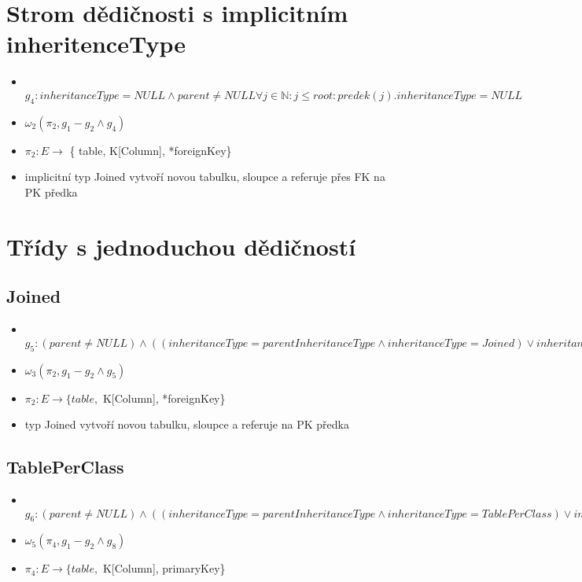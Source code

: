 \documentclass[11pt,a4paper]{article}   	%
\begin{document}
 	\section{Strom dědičnosti s implicitním inheritenceType}
 		\begin{itemize}
 		  	\item 	\texttt {
 		  					$ g_4: inheritanceType = NULL \wedge parent \neq NULL
 		  					\forall j \in \mathbb{N} : j \leq root : predek(j).inheritanceType =
 		  					NULL$ }
 		  	\item 	$\omega_2 (\pi_2, g_1 - g_2 \wedge g_4) $
 		  	\item 	$\pi_2 : E \to$ \{ table,  K[Column], *foreignKey\}
 		  	\item	implicitní typ Joined vytvoří novou tabulku, sloupce a referuje
 		  			přes FK na PK předka
 		\end{itemize}
 		
 	\section{Třídy s jednoduchou dědičností}
 	 	\subsection{Joined}
 			\begin{itemize}
 			  	\item 	\texttt {
 			  				$g_5 : (parent \neq NULL) \wedge (( inheritanceType =
 			  				parentInheritanceType \wedge inheritanceType = Joined) \vee
 			  				inheritanceType = NULL \wedge \exists i \in \mathbb{N}: \forall j \in
 			  				\mathbb{N} : j < i : predek(j).inheritanceType = NULL ,
 			  				predek(i).inheritanceType = Joined )$ 
 			  			}
 				\item 	$\omega_3 (\pi_2, g_1 - g_2 \wedge g_5)$
 				\item	$\pi_2 : E \to \{ table, $ K[Column], *foreignKey\}
				\item	typ Joined vytvoří novou tabulku, sloupce a referuje na PK předka 	 			
 			\end{itemize}
 			
		\subsection{TablePerClass}
			\begin{itemize} 
			  	\item 	\texttt{
			  				$g_6 : (parent \neq NULL) \wedge (( inheritanceType =
 			  				parentInheritanceType \wedge inheritanceType = TablePerClass) \vee
 			  				inheritanceType = NULL \wedge \exists i \in \mathbb{N}: \forall j \in
 			  				\mathbb{N} : j < i : predek(j).inheritanceType = NULL ,
 			  				predek(i).inheritanceType = TablePerClass )$
 			  			}
			  	\item 	$\omega_5 (\pi_4, g_1 - g_2 \wedge g_8) $
			  	\item 	$\pi_4 : E \to \{ table, $ K[Column], primaryKey\}
				
			\end{itemize}
		
\end{document}
